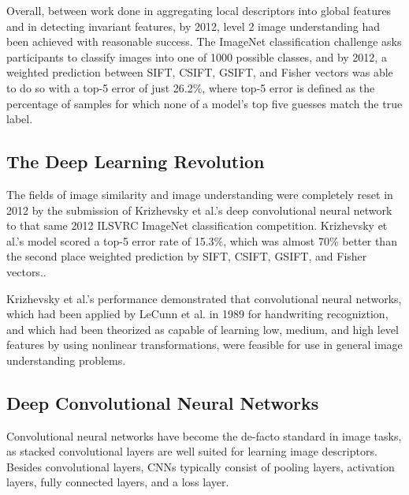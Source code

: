 Overall, between work done in aggregating local descriptors into global features and in detecting invariant features, by 2012, level 2 image understanding had been achieved with reasonable success. The ImageNet classification challenge asks participants to classify images into one of 1000 possible classes, and by 2012, a weighted prediction between SIFT, CSIFT, GSIFT, and Fisher vectors was able to do so with a top-5 error of just 26.2\%, where top-5 error is defined as the percentage of samples for which none of a model's top five guesses match the true label.\cite{russakovsky2015imagenet}

\subsection{The Deep Learning Revolution}
The fields of image similarity and image understanding were completely reset in 2012 by the submission of Krizhevsky et al.'s deep convolutional neural network to that same 2012 ILSVRC ImageNet classification competition. Krizhevsky et al.'s model scored a top-5 error rate of 15.3\%, which was almost 70\% better than the second place weighted prediction by SIFT, CSIFT, GSIFT, and Fisher vectors.\cite{krizhevsky2012imagenet}.

Krizhevsky et al.'s performance demonstrated that convolutional neural networks, which had been applied by LeCunn et al. in 1989 for handwriting recogniztion, and which had been theorized as capable of learning low, medium, and high level features by using nonlinear transformations, were feasible for use in general image understanding problems.\cite{lecun1989backpropagation}


\subsection{Deep Convolutional Neural Networks}
Convolutional neural networks have become the de-facto standard in image tasks, as stacked convolutional layers are well suited for learning image descriptors.\cite{karpathy2014large}\cite{krizhevsky2012imagenet}\cite{szegedy2015going} Besides convolutional layers, CNNs typically consist of pooling layers, activation layers, fully connected layers, and a loss layer. 

